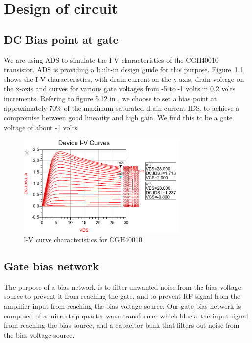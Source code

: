 \chapter{Design of circuit}
  
  \section{DC Bias point at gate}

  We are using ADS to simulate the I-V characteristics of the CGH40010 transistor. ADS is providing a built-in design guide for this purpose. Figure~\ref{fig:fig_IV} shows the I-V characteristics, with drain current on the y-axis, drain voltage on the x-axis and curves for various gate voltages from -5 to -1 volts in 0.2 volts increments. Refering to figure 5.12 in \cite[p.~200]{AmpRobertson}, we choose to set a bias point at approximately 70\% of the maximum saturated drain current IDS, to achieve a compromise between good linearity and high gain. We find this to be a gate voltage of about -1 volts.

  \begin{figure}[h]
	  \label{fig:fig_IV}
	  \centering
	  \includegraphics[width=0.75\textwidth]{img/01_IVCurve.png}
	  \caption{I-V curve characteristics for CGH40010}
  \end{figure}

  \section{Gate bias network}
  The purpose of a bias network is to filter unwanted noise from the bias voltage source to prevent it from reaching the gate, and to prevent RF signal from the amplifier input from reaching the bias voltage source. Our gate bias network is composed of a microstrip quarter-wave transformer which blocks the input signal from reaching the bias source, and a capacitor bank that filters out noise from the bias voltage source.

